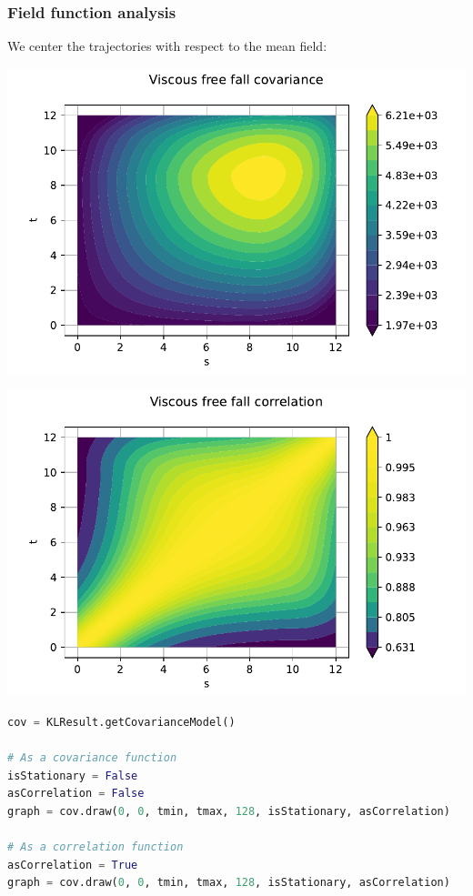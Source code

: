 \documentclass{beamer}
\begin{document}
\begin{frame}[containsverbatim]
\frametitle{Field function analysis}

\scriptsize

We center the trajectories with respect to the mean field:

\begin{minipage}[t]{0.5\textwidth}
    \includegraphics[width=\textwidth]{figures/Covariance.pdf}
\end{minipage}%
\begin{minipage}[t]{0.5\textwidth}
    \includegraphics[width=\textwidth]{figures/Correlation.pdf}
\end{minipage}


\begin{lstlisting}[language=Python, numbers = none]
cov = KLResult.getCovarianceModel()

# As a covariance function
isStationary = False
asCorrelation = False
graph = cov.draw(0, 0, tmin, tmax, 128, isStationary, asCorrelation)

# As a correlation function
asCorrelation = True
graph = cov.draw(0, 0, tmin, tmax, 128, isStationary, asCorrelation)
\end{lstlisting}
\end{frame}
\end{document}
